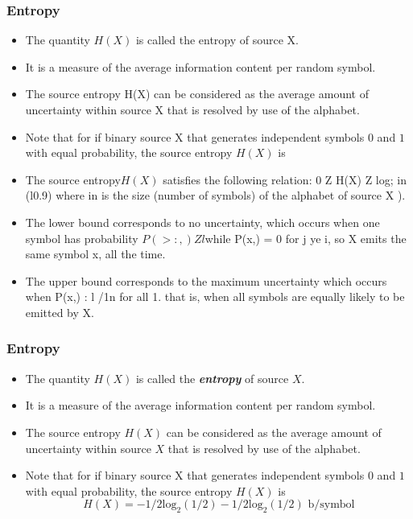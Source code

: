 \documentclass[a4]{beamer}
\begin{document}

\begin{frame}
\frametitle{Entropy}
\begin{itemize}
	\item The quantity $H(X)$ is called the entropy of source X. \item It is a measure of the average information content per random symbol. 
	\item The source entropy H(X) can be considered as the average amount of uncertainty
	within source X that is resolved by use of the alphabet.
	
	\item Note that for if  binary source X that generates independent symbols $0$ and $1$ with equal probability, the source entropy $H(X)$ is
	\item The source entropy$ H(X)$ satisfies the following relation:
	0 Z H(X) Z log; in (l0.9) where in is the size (number of symbols) of the alphabet of source X ). 
	\item  The lower bound corresponds to no uncertainty, which occurs when one symbol has probability $P(>:,)Zl $while 
	P(x,) = 0 for j ye i, so X emits the same symbol x, all the time. \item The upper bound corresponds to the maximum uncertainty which occurs when P(x,) : l /1n for all 1. that is, when all symbols are equally likely to be emitted by X.
\end{itemize}
\end{frame}
\begin{frame}


\frametitle{Entropy}
\begin{itemize}
	\item The quantity $H(X)$ is called the \emph{\textbf{entropy}} of source $X$. \item It is a measure of the average information content per random symbol.
	\item The source entropy $H(X)$ can be considered as the average amount of uncertainty
	within source $X$ that is resolved by use of the alphabet.
	
	\item Note that for if  binary source X that generates independent symbols $0$ and $1$ with equal probability, the source entropy $H(X)$ is
	\[ H(X ) = -1/2 \mbox{log}_2 (1/2) - 1/2 \mbox{log}_2 (1/2) \mbox{   b/symbol}  \]
\end{itemize}
\end{frame}
\end{document}
